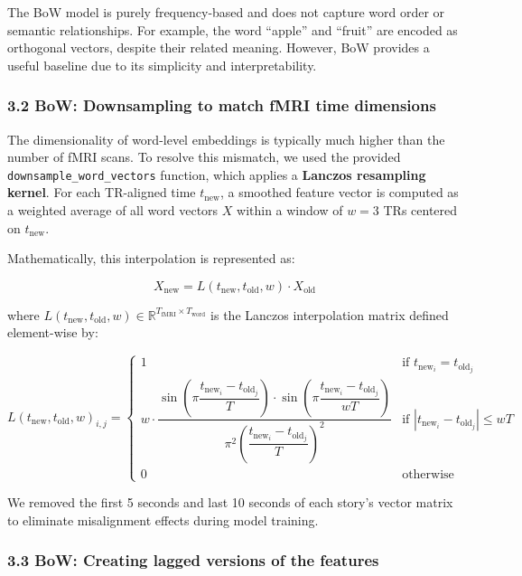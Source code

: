 \documentclass[11pt]{article}
\begin{document}
The BoW model is purely frequency-based and does not capture word order
or semantic relationships. For example, the word ``apple'' and ``fruit''
are encoded as orthogonal vectors, despite their related meaning.
However, BoW provides a useful baseline due to its simplicity and
interpretability.

\hypertarget{bow-downsampling-to-match-fmri-time-dimensions}{%
\subsubsection{3.2 BoW: Downsampling to match fMRI time
dimensions}\label{bow-downsampling-to-match-fmri-time-dimensions}}

The dimensionality of word-level embeddings is typically much higher
than the number of fMRI scans. To resolve this mismatch, we used the
provided \texttt{downsample\_word\_vectors} function, which applies a
\textbf{Lanczos resampling kernel}. For each TR-aligned time
\(t_{\text{new}}\), a smoothed feature vector is computed as a weighted
average of all word vectors \(X\) within a window of \(w = 3\) TRs
centered on \(t_{\text{new}}\).

Mathematically, this interpolation is represented as:

\[
X_{\text{new}} = L(t_{\text{new}}, t_{\text{old}}, w) \cdot X_{\text{old}}
\]

where
\(L(t_{\text{new}}, t_{\text{old}}, w) \in \mathbb{R}^{T_{\text{fMRI}} \times T_{\text{word}}}\)
is the Lanczos interpolation matrix defined element-wise by:

\[
L(t_{\text{new}}, t_{\text{old}}, w)_{i,j} =
\begin{cases}
1 & \text{if } t_{\text{new}_i} = t_{\text{old}_j} \\
w \cdot \dfrac{\sin\left( \pi \dfrac{t_{\text{new}_i} - t_{\text{old}_j}}{T} \right) \cdot \sin\left( \pi \dfrac{t_{\text{new}_i} - t_{\text{old}_j}}{wT} \right)}{\pi^2 \left( \dfrac{t_{\text{new}_i} - t_{\text{old}_j}}{T} \right)^2} & \text{if } |t_{\text{new}_i} - t_{\text{old}_j}| \leq wT \\
0 & \text{otherwise}
\end{cases}
\]

We removed the first 5 seconds and last 10 seconds of each story's
vector matrix to eliminate misalignment effects during model training.

\hypertarget{bow-creating-lagged-versions-of-the-features}{%
\subsubsection{3.3 BoW: Creating lagged versions of the
features}\label{bow-creating-lagged-versions-of-the-features}}
\end{document}
